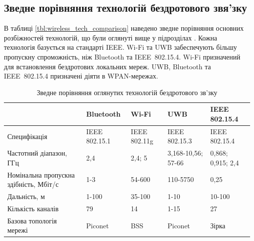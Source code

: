 \documentclass[a4paper,ukrainian,utf8,nocolumnsxix,floatsection,equationsection]{eskdtext}
\newcommand{\iee}[0]{IEEE~802.15.4\xspace}
\begin{document}
\subsection{Зведне порівняння технологій бездротового звя’зку}

В таблиці \ref{tbl:wireless_tech_comparison} наведено зведне порівняння основних розбіжностей технологій, що були оглянуті вище у підрозділах . Кожна технологія базується на стандарті IEEE. Wi-Fi та UWB забеспечують більшу пропускну спроможність, ніж Bluetooth та \iee. Wi-Fi призначений для встановлення бездротових локальних мереж. UWB, Bluetooth та \iee призначені діяти в WPAN-мережах.


\begin{table}[htbp]
\caption{Зведне порівняння оглянутих технологій бездротового зв’зку}
\begin{tabular}{|p{}|p{}|p{}|p{}|p{}|}
\hline
                                       & Bluetooth               & Wi-Fi                                                  & UWB                     & IEEE 802.15.4            \\ \hline
Специфікація                           & IEEE 802.15.1 	         & IEEE 802.11g                                           & IEEE 802.15.3           & IEEE 802.15.4            \\ \hline
Частотний діапазон, ГГц                & 2,4                     & 2,4; 5                                                 & 3,168-10,56; 57-66      & 0,868; 0,915; 2,4        \\ \hline
Номінальна пропускна здібність, Мбіт/с & 1-3                     & 54-600                                                 & 110-5750                & 0,25                     \\ \hline
Дальність, м                           & 1-100                   & 35-100                                                 & 1-10                    & 10-100                   \\ \hline
Кількість каналів                      & 79                      & 14                                                     & 1-15                    & 27                       \\ \hline
Базова топологія мережі                & Piconet                 & BSS                                                    & Piconet                 & Зірка                    \\ \hline

\end{tabular}
\end{table}
\end{document}
